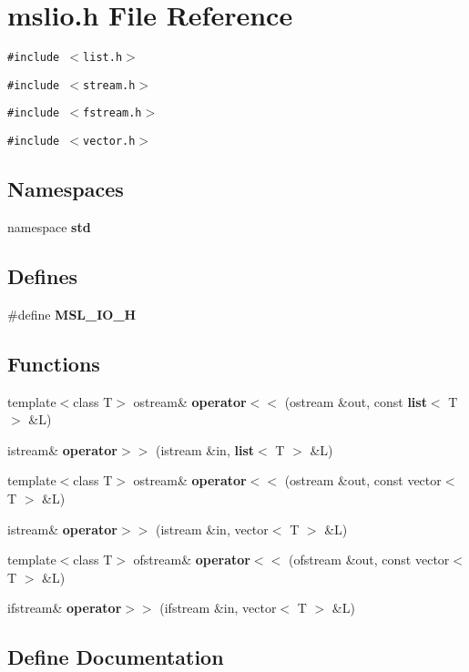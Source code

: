 \section{mslio.h File Reference}
\label{mslio_8h}
{\tt \#include $<$list.h$>$}\par
{\tt \#include $<$stream.h$>$}\par
{\tt \#include $<$fstream.h$>$}\par
{\tt \#include $<$vector.h$>$}\par
\subsection*{Namespaces}
\begin{CompactItemize}
\item 
namespace {\bf std}
\end{CompactItemize}
\subsection*{Defines}
\begin{CompactItemize}
\item 
\#define {\bf MSL\_\-IO\_\-H}
\end{CompactItemize}
\subsection*{Functions}
\begin{CompactItemize}
\item 
template$<$class T$>$ ostream\& {\bf operator$<$$<$} (ostream \&out, const {\bf list}$<$ T $>$ \&L)
\item 
istream\& {\bf operator$>$$>$} (istream \&in, {\bf list}$<$ T $>$ \&L)
\item 
template$<$class T$>$ ostream\& {\bf operator$<$$<$} (ostream \&out, const vector$<$ T $>$ \&L)
\item 
istream\& {\bf operator$>$$>$} (istream \&in, vector$<$ T $>$ \&L)
\item 
template$<$class T$>$ ofstream\& {\bf operator$<$$<$} (ofstream \&out, const vector$<$ T $>$ \&L)
\item 
ifstream\& {\bf operator$>$$>$} (ifstream \&in, vector$<$ T $>$ \&L)
\end{CompactItemize}


\subsection{Define Documentation}
